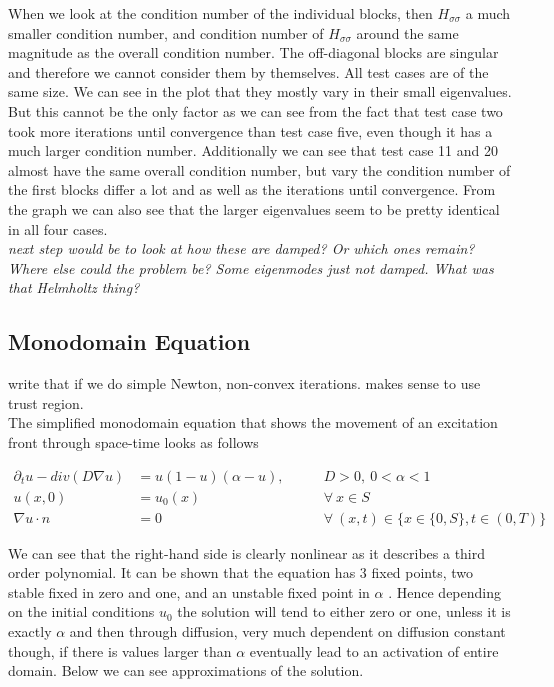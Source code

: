 \documentclass[../draft_1.tex]{subfiles}
\begin{document}
When we look at the condition number of the individual blocks, then $H_{\sigma \sigma}$  a much smaller condition number, and condition number of $H_{\sigma \sigma}$ around the same magnitude as the overall condition number. The off-diagonal blocks are singular and therefore we cannot consider them by themselves. All test cases are of the same size. We can see in the plot that they mostly vary in their small eigenvalues. But this cannot be the only factor as we can see from the fact that test case two took more iterations until convergence than test case five, even though it has a much larger condition number. Additionally we can see that test case 11 and 20 almost have the same overall condition number, but vary the condition number of the first blocks differ a lot and as well as the iterations until convergence. From the graph we can also see that the larger eigenvalues seem to be pretty identical in all four cases. 
\\
\textit{next step would be to look at how these are damped? Or which ones remain? Where else could the problem be? Some eigenmodes just not damped. What was that Helmholtz thing?}

\FloatBarrier
\subsection{Monodomain Equation}
write that if we do simple Newton, non-convex iterations. makes sense to use trust region.
\\
The simplified monodomain equation that shows the movement of an excitation front through space-time looks as follows

\begin{ceqn}
	\begin{equation}
	\begin{aligned}
	\partial_t u - div(D \nabla u) &= u (1 - u ) (\alpha - u), \qquad &D > 0, \ 0 < \alpha < 1 \\
	u(x, 0) &= u_0(x) &\forall \ x \in S \\
	\nabla u \cdot n &= 0 \qquad &\forall \ (x,t) \in \{ x \in \{0,S\}, t \in (0,T) \} 
	\end{aligned}
	\end{equation}
\end{ceqn}
We can see that the right-hand side is clearly nonlinear as it describes a third order polynomial. It can be shown that the equation has 3 fixed points, two stable fixed in zero and one, and an unstable fixed point in $\alpha$ \cite{deuflhard2011adaptive}. Hence depending on the initial conditions $u_0$ the solution will tend to either zero or one, unless it is exactly $\alpha$ and then through diffusion, very much dependent on diffusion constant though, if there is values larger than $\alpha$ eventually lead to an activation of entire domain. Below we can see approximations of the solution.
\end{document}

